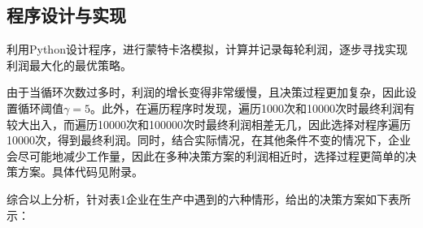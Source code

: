 \documentclass[withoutpreface,bwprint]{cumcmthesis} %
\begin{document}
\subsection{程序设计与实现}

利用Python设计程序，进行蒙特卡洛模拟，计算并记录每轮利润，逐步寻找实现利润最大化的最优策略。

由于当循环次数过多时，利润的增长变得非常缓慢，且决策过程更加复杂，因此设置循环阈值$\gamma = 5$。此外，在遍历程序时发现，遍历1000次和10000次时最终利润有较大出入，而遍历10000次和100000次时最终利润相差无几，因此选择对程序遍历10000次，得到最终利润。同时，结合实际情况，在其他条件不变的情况下，企业会尽可能地减少工作量，因此在多种决策方案的利润相近时，选择过程更简单的决策方案。具体代码见附录。

综合以上分析，针对表1企业在生产中遇到的六种情形，给出的决策方案如下表所示：
\end{document}
